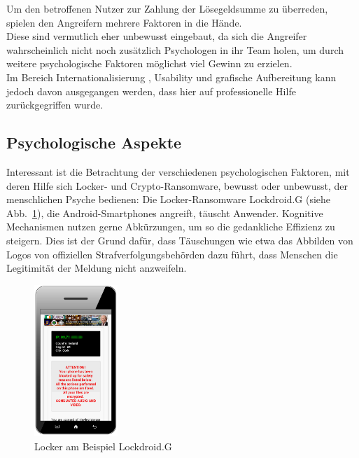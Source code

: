 Um den betroffenen Nutzer zur Zahlung der Lösegeldsumme zu überreden, spielen den Angreifern mehrere Faktoren in die Hände. \\
Diese sind vermutlich eher unbewusst eingebaut, da sich die Angreifer wahrscheinlich nicht noch zusätzlich Psychologen in ihr Team holen, um durch weitere psychologische Faktoren möglichst viel Gewinn zu erzielen. \\
Im Bereich Internationalisierung \cite{faktoren:l18n}, Usability und grafische Aufbereitung \cite{faktoren:grafik} \cite{evolution} kann jedoch davon ausgegangen werden, dass hier auf professionelle Hilfe zurückgegriffen wurde.

\subsection{Psychologische Aspekte}




Interessant ist die Betrachtung der verschiedenen psychologischen Faktoren, mit deren Hilfe sich Locker- und Crypto-Ransomware, bewusst oder unbewusst, der menschlichen Psyche bedienen:
Die Locker-Ransomware \glqq Lockdroid.G\grqq{} (siehe Abb.~\ref{fig:lockdroid}), die Android-Smartphones angreift, täuscht Anwender. Kognitive Mechanismen nutzen gerne Abkürzungen, um so die gedankliche Effizienz zu steigern. Dies ist der Grund dafür, dass Täuschungen wie etwa das Abbilden von Logos von offiziellen Strafverfolgungsbehörden dazu führt, dass Menschen die Legitimität der Meldung nicht anzweifeln. 

\begin{figure}[h]
  \centering
  \includegraphics[width=0.28\textwidth]{img/android_locker.png}
  \caption{Locker am Beispiel \glqq Lockdroid.G\grqq{} \cite{evolution}}
  \label{fig:lockdroid}
\end{figure}

